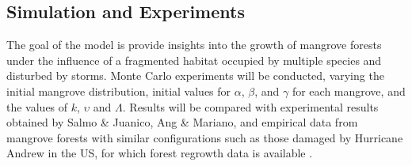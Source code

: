 \subsection{Simulation and Experiments}
The goal of the model is provide insights into the growth of mangrove forests under the influence of a fragmented habitat occupied by multiple species and disturbed by storms. Monte Carlo experiments will be conducted, varying the initial mangrove distribution, initial values for $\alpha$, $\beta$, and $\gamma$ for each mangrove, and the values of $k$, $\upsilon$ and $\Lambda$. Results will be compared with experimental results obtained by Salmo \& Juanico, Ang \& Mariano, and empirical data from mangrove forests with similar configurations such as those damaged by Hurricane Andrew in the US, for which forest regrowth data is available \cite{baldwinMangroveRegeneration}.